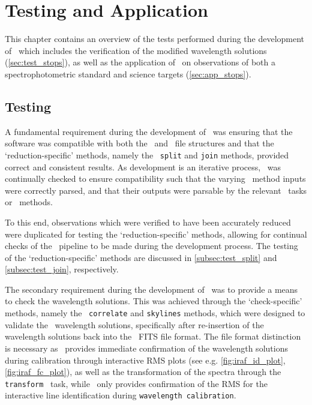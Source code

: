 \chapter{Testing and Application} \label{ch:04}

This chapter contains an overview of the tests performed during the development of \stops\ which includes the verification of the modified wavelength solutions (\autoref{sec:test_stops}), as well as the application of \stops\ on observations of both a spectrophotometric standard and science targets (\autoref{sec:app_stops}).

\section[Testing \textsc{stops}]{Testing \stops} \label{sec:test_stops}



A fundamental requirement during the development of \stops\ was ensuring that the software was compatible with both the \polsalt\ and \iraf\ file structures and that the `reduction-specific' methods, namely the \stops\ \texttt{split} and \texttt{join} methods, provided correct and consistent results.
As development is an iterative process, \stops\ was continually checked to ensure compatibility such that the varying \stops\ method inputs were correctly parsed, and that their outputs were parsable by the relevant \iraf\ tasks or \polsalt\ methods.

To this end, observations which were verified to have been accurately reduced were duplicated for testing the `reduction-specific' methods, allowing for continual checks of the \stops\ pipeline to be made during the development process.
The testing of the `reduction-specific' methods are discussed in \autoref{subsec:test_split} and \autoref{subsec:test_join}, respectively.

The secondary requirement during the development of \stops\ was to provide a means to check the wavelength solutions.
This was achieved through the `check-specific' methods, namely the \stops\ \texttt{correlate} and \texttt{skylines} methods, which were designed to validate the \iraf\ wavelength solutions, specifically after re-insertion of the wavelength solutions back into the \polsalt\ \gls{FITS} file format.
The file format distinction is necessary as \iraf\ provides immediate confirmation of the wavelength solutions during calibration through interactive \gls{RMS} plots (see e.g. \autoref{fig:iraf_id_plot}, \ref{fig:iraf_fc_plot}), as well as the transformation of the spectra through the \texttt{transform} \iraf\ task, while \polsalt\ only provides confirmation of the \gls{RMS} for the interactive line identification during \texttt{wavelength calibration}.

